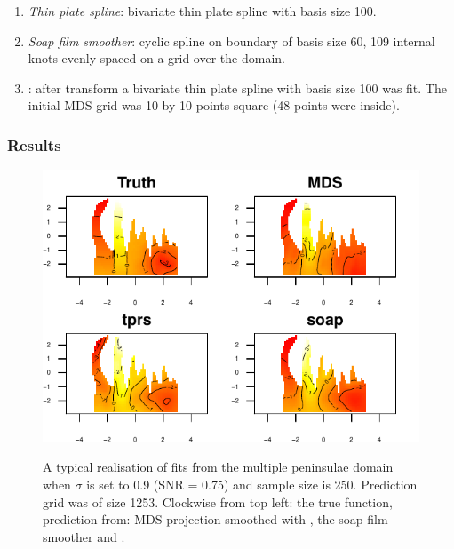 {\begin{enumerate}
\item \emph{Thin plate spline}: bivariate thin plate spline with basis size 100. 
\item \emph{Soap film smoother}: cyclic spline on boundary of basis size 60, 109 internal knots evenly spaced on a grid over the domain.
\item \emph{\mdsap}: after transform a bivariate thin plate spline with basis size 100 was fit. The initial MDS grid was 10 by 10 points square (48 points were inside).
\end{enumerate} 

\subsubsection{Results}

\begin{figure}
\centering
\includegraphics[width=6in]{mds/figs/wt2-comp-09.pdf} \\
\caption{A typical realisation of fits from the multiple peninsulae domain when $\sigma$ is set to 0.9 (SNR = 0.75) and sample size is 250. Prediction grid was of size 1253. Clockwise from top left: the true function, prediction from: MDS projection smoothed with \tprs, the soap film smoother and \tprs.}
\label{wt2-comp-0.9}
\end{figure}

}
